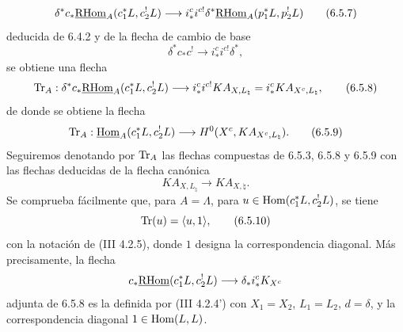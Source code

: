 \begin{equation}
\delta^*c_*\underline{\mathrm{RHom}}_A(c_1^*L,c_2^!L)
\longrightarrow
i_*^ci^{c!}\delta^*\underline{\mathrm{RHom}}_A(p_1^*L,p_2^!L)
\tag{6.5.7}
\end{equation}
deducida de 6.4.2 y de la flecha de cambio de base
\[
\delta^*c_*c^!\longrightarrow i_*^ci^{c!}\delta^*,
\]
se obtiene una flecha
\begin{equation}
\operatorname{Tr}_A:\delta^*c_*\underline{\mathrm{RHom}}_A(c_1^*L,c_2^!L)
\longrightarrow
i_*^ci^{c!}KA_{X,L_{\natural}}
=i_*^cKA_{X^c,L_{\natural}},
\tag{6.5.8}
\end{equation}
de donde se obtiene la flecha
\begin{equation}
\operatorname{Tr}_A:\underline{\operatorname{Hom}}_A(c_1^*L,c_2^!L)
\longrightarrow
H^0(X^c,KA_{X^c,L_{\natural}}).
\tag{6.5.9}
\end{equation}
Seguiremos denotando por $\operatorname{Tr}_A$ las flechas compuestas de 6.5.3, 6.5.8 y 6.5.9 con las flechas deducidas de la flecha canónica
\[
KA_{X,L_{\natural}}\longrightarrow KA_{X,\natural}.
\]
Se comprueba fácilmente que, para $A=\Lambda$, para $u\in\operatorname{Hom}(c_1^*L,c_2^!L)$, se tiene
\begin{equation}
\operatorname{Tr}(u)=\langle u,1\rangle,
\tag{6.5.10}
\end{equation}
con la notación de (III 4.2.5), donde $1$ designa la correspondencia diagonal. Más precisamente, la flecha
\[
c_*\underline{\mathrm{RHom}}(c_1^*L,c_2^!L)\longrightarrow \delta_*i_*^cK_{X^c}
\]
adjunta de 6.5.8 es la definida por (III 4.2.4') con $X_1=X_2$, $L_1=L_2$, $d=\delta$, y la correspondencia diagonal $1\in\operatorname{Hom}(L,L)$.
